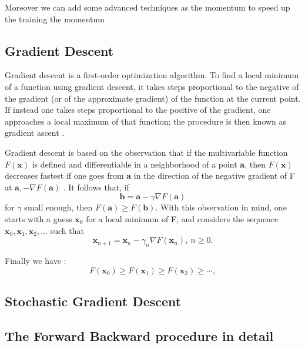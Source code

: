 Moreover we can add some advanced techniques as the momentum to speed up the training the momentum 


\subsection{Gradient Descent}
Gradient descent is a first-order optimization algorithm. To find a local minimum of a function using gradient descent, it takes steps proportional to the negative of the gradient (or of the approximate gradient) of the function at the current point. If instead one takes steps proportional to the positive of the gradient, one approaches a local maximum of that function; the procedure is then known as gradient ascent \cite{Kiwiel2001,Qian1999}.

Gradient descent is based on the observation that if the multivariable function $F(\mathbf{x})$ is defined and differentiable in a neighborhood of a point $\mathbf{a}$, then $F(\mathbf{x})$ decreases fastest if one goes from $\mathbf{a}$ in the direction of the negative gradient of F at $\mathbf{a}, -\nabla F(\mathbf{a})$ \cite{Yuan1999}. It follows that, if
\begin{equation}
\mathbf{b} = \mathbf{a}-\gamma\nabla F(\mathbf{a})
\end{equation}
for $\gamma$ small enough, then $F(\mathbf{a})\geq F(\mathbf{b})$. With this observation in mind, one starts with a guess $\mathbf{x}_0$ for a local minimum of F, and considers the sequence $\mathbf{x}_0, \mathbf{x}_1, \mathbf{x}_2, \dots$ such that
\begin{equation}
\mathbf{x}_{n+1}=\mathbf{x}_n-\gamma_n \nabla F(\mathbf{x}_n),\ n \ge 0.
\end{equation}

Finally we have \cite{Cauchy1847}:
\begin{equation}
F(\mathbf{x}_0)\ge F(\mathbf{x}_1)\ge F(\mathbf{x}_2)\ge \cdots,
\end{equation}


\subsection{Stochastic Gradient Descent}

\subsection{The Forward Backward procedure in detail}

